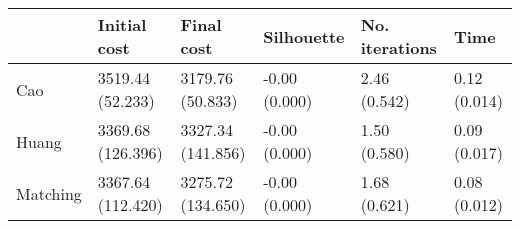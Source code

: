 \begin{tabular}{llllll}
\toprule
{} &       Initial cost &         Final cost &     Silhouette & No. iterations &          Time \\
\midrule
Cao      &   3519.44 (52.233) &   3179.76 (50.833) &  -0.00 (0.000) &   2.46 (0.542) &  0.12 (0.014) \\
Huang    &  3369.68 (126.396) &  3327.34 (141.856) &  -0.00 (0.000) &   1.50 (0.580) &  0.09 (0.017) \\
Matching &  3367.64 (112.420) &  3275.72 (134.650) &  -0.00 (0.000) &   1.68 (0.621) &  0.08 (0.012) \\
\bottomrule
\end{tabular}
